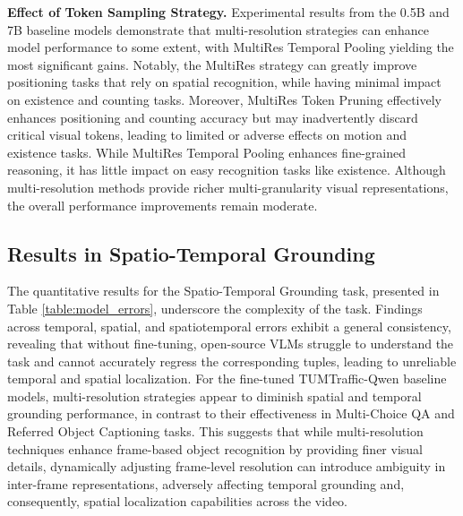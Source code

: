  


\noindent\textbf{Effect of Token Sampling Strategy.} Experimental results from the 0.5B and 7B baseline models demonstrate that multi-resolution strategies can enhance model performance to some extent, with MultiRes Temporal Pooling yielding the most significant gains. Notably, the MultiRes strategy can greatly improve positioning tasks that rely on spatial recognition, while having minimal impact on existence and counting tasks. Moreover, MultiRes Token Pruning effectively enhances positioning and counting accuracy but may inadvertently discard critical visual tokens, leading to limited or adverse effects on motion and existence tasks. While MultiRes Temporal Pooling enhances fine-grained reasoning, it has little impact on easy recognition tasks like existence. Although multi-resolution methods provide richer multi-granularity visual representations, the overall performance improvements remain moderate.



\subsection{Results in Spatio-Temporal Grounding} 
The quantitative results for the Spatio-Temporal Grounding task, presented in Table \ref{table:model_errors}, underscore the complexity of the task. Findings across temporal, spatial, and spatiotemporal errors exhibit a general consistency, revealing that without fine-tuning, open-source VLMs struggle to understand the task and cannot accurately regress the corresponding tuples, leading to unreliable temporal and spatial localization. For the fine-tuned TUMTraffic-Qwen baseline models, multi-resolution strategies appear to diminish spatial and temporal grounding performance, in contrast to their effectiveness in Multi-Choice QA and Referred Object Captioning tasks. This suggests that while multi-resolution techniques enhance frame-based object recognition by providing finer visual details, dynamically adjusting frame-level resolution can introduce ambiguity in inter-frame representations, adversely affecting temporal grounding and, consequently, spatial localization capabilities across the video.








